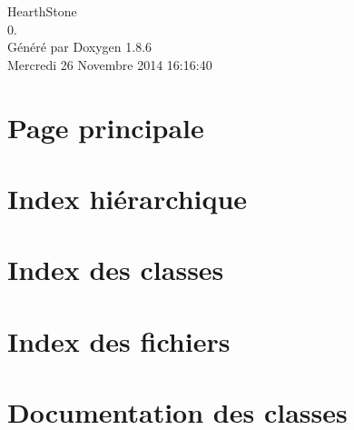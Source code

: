 \documentclass[twoside]{book}
\newcommand{\clearemptydoublepage}{%
  \newpage{\pagestyle{empty}\cleardoublepage}%
}
\begin{document}
\hypersetup{pageanchor=false}
\begin{titlepage}
\vspace*{7cm}
\begin{center}%
{\Large Hearth\-Stone \\[1ex]\large 0. }\\
\vspace*{1cm}
{\large Généré par Doxygen 1.8.6}\\
\vspace*{0.5cm}
{\small Mercredi 26 Novembre 2014 16:16:40}\\
\end{center}
\end{titlepage}
\clearemptydoublepage
\tableofcontents
\clearemptydoublepage
{}
\hypersetup{pageanchor=true}

\chapter{Page principale}
\label{index}\hypertarget{index}{}
\chapter{Index hiérarchique}

\chapter{Index des classes}

\chapter{Index des fichiers}

\chapter{Documentation des classes}



























\end{document}
